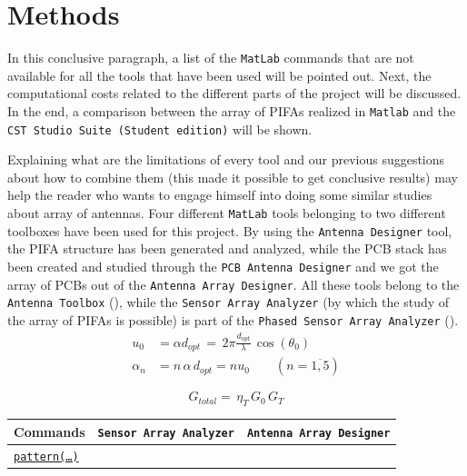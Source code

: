 \documentclass[10pt,a4paper,twocolumn]{article}
\begin{document}
{\section*{Methods}
In this conclusive paragraph, a list of the \texttt{\color{BurntOrange}MatLab} commands that are not available for all the tools that have been used will be pointed out. Next, the computational costs related to the different parts of the project will be discussed. In the end, a comparison between the array of PIFAs realized in \texttt{\color{BurntOrange}Matlab} and the \texttt{\color{Periwinkle}CST Studio Suite (Student edition)} will be shown. 

\indent Explaining what are the limitations of every tool and our previous suggestions about how to combine them (this made it possible to get conclusive results) may help the reader who wants to engage himself into doing some similar studies about array of antennas. Four different \texttt{\color{BurntOrange}MatLab} tools belonging to two different toolboxes have been used for this project. By using the \texttt{\color{Mahogany}Antenna Designer} tool, the PIFA structure has been generated and analyzed, while the PCB stack has been created and studied through the \texttt{\color{Mahogany}PCB Antenna Designer} and we got the array of PCBs out of the \texttt{\color{Mahogany}Antenna Array Designer}. All these tools belong to the \texttt{\color{ForestGreen}Antenna Toolbox} (\textbf{\cite{AntennaToolbox}}), while the \texttt{\color{Mahogany}Sensor Array Analyzer} (by which the study of the array of PIFAs is possible) is part of the \texttt{\color{ForestGreen}Phased Sensor Array Analyzer} (\textbf{\cite{PhasedArraySystemToolbox}}). 
\begin{equation}
	\begin{aligned}
		u_0&=\alpha d_{opt}\,=\,2\pi\frac{d_{opt}}{\lambda}\,\cos(\theta_0)\\
		\alpha_n&=n\,\alpha\,d_{opt}=nu_0\qquad \left(n=\overline{1,5}\right)
		\label{eq:phase coefficients}
	\end{aligned}
\end{equation}

\begin{equation}
	G_{total}=\,\eta_T\,G_0\,G_T
	\label{eq:pattern multiplication}
\end{equation}
\begin{table}
	\begin{center}
		{\selectfont
		\begin{tabular}{||m{14cm}|m{1.6cm}|m{1.6cm}||}
			\hline
	\textbf{Commands} & \texttt{\color{Mahogany}Sensor Array Analyzer} & \texttt{\color{Mahogany}Antenna Array Designer} \\
	\hline
	\cellcolor{pink} \underline{\texttt{pattern(\dots)}}
	

\end{tabular}}
\end{center}
\end{table}}
\end{document}
